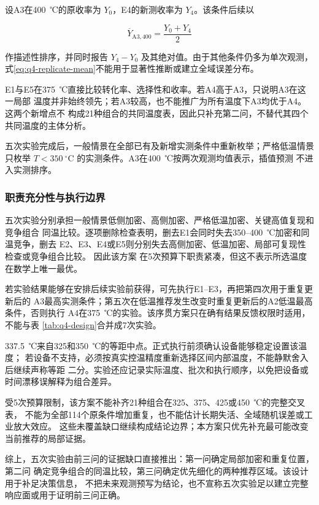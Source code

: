 设A3在400~℃的原收率为 \(Y_0\)，E4的新测收率为 \(Y_4\)。该条件后续以

\begin{equation}
\overline{Y}_{\mathrm{A3},400}
=\frac{Y_0+Y_4}{2}
\tag{21}
\label{eq:q4-replicate-mean}
\end{equation}

作描述性排序，并同时报告 \(Y_4-Y_0\) 及其绝对值。由于其他条件仍多为单次观测，
式\eqref{eq:q4-replicate-mean}不能用于显著性推断或建立全域误差分布。

E1与E5在375~℃直接比较转化率、选择性和收率。若A4高于A3，只说明A3在这一局部
温度并非始终领先；若A3较高，也不能推广为所有温度下A3均优于A4。这两个新增点不
构成21种组合的共同温度表，因此只补充第二问，不替代其四个共同温度的主体分析。

五次实验完成后，一般情景在全部已有及新增实测条件中重新枚举；严格低温情景只枚举
\(T<350~^\circ\mathrm{C}\) 的实测条件。A3在400~℃按两次观测均值表示，插值预测
不进入实测排序。

\subsubsection{职责充分性与执行边界}

五次实验分别承担一般情景低侧加密、高侧加密、严格低温加密、关键高值复现和竞争组合
同温比较。逐项删除检查表明，删去E1会同时失去350--400~℃加密和同温竞争，删去
E2、E3、E4或E5则分别失去高侧加密、低温加密、局部可复现性检查或竞争组合比较。
因此该方案
在5次预算下职责紧凑，但这不表示所选温度在数学上唯一最优。

若实验结果能够在安排后续实验前获得，可先执行E1--E3，再把第四次用于重复更新后的
A3最高实测条件；第五次在低温推荐发生改变时重复更新后的A2低温最高条件，否则执行
A4在375~℃的实验。该序贯方案只在确有结果反馈权限时适用，不能与表
\ref{tab:q4-design}合并成7次实验。

337.5~℃来自325和350~℃的等距中点。正式执行前须确认设备能够稳定设置该温度；
若设备不支持，必须按真实控温精度重新选择区间内部温度，不能静默舍入后继续声称等距
二分。实验还应记录实际温度、批次和执行顺序，以免把设备或时间漂移误解释为组合差异。

受5次预算限制，该方案不能补齐21种组合在325、375、425或450~℃的完整交叉表，
不能为全部114个原条件增加重复，也不能估计长期失活、全域随机误差或工业放大效应。
这些未覆盖缺口继续构成结论边界；本方案只优先补充最可能改变当前推荐的局部证据。

综上，五次实验由前三问的证据缺口直接推出：第一问确定局部加密和重复位置，第二问
确定竞争组合的同温比较，第三问确定优先细化的两种推荐区域。该设计用于补足决策信息，
不把未来观测预写为结论，也不宣称五次实验足以建立完整响应面或用于证明前三问正确。
